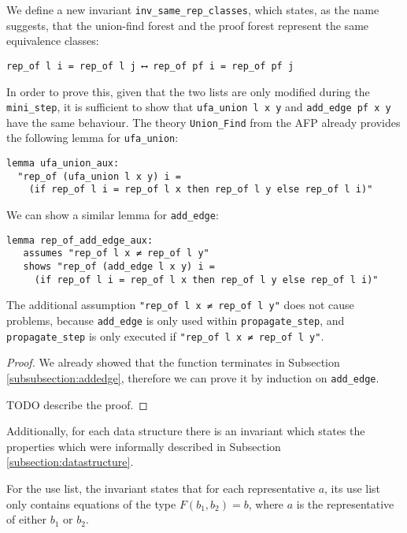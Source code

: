 We define a new invariant \lstinline{inv_same_rep_classes}, which states, as the name suggests, that the union-find forest and the proof forest represent the same equivalence classes:

\begin{lstlisting}
rep_of l i = rep_of l j ⟷ rep_of pf i = rep_of pf j
\end{lstlisting}

In order to prove this, given that the two lists are only modified during the \lstinline{mini_step}, it is sufficient to show that \lstinline{ufa_union l x y} and \lstinline{add_edge pf x y} have the same behaviour. The theory \lstinline{Union_Find} from the AFP\cite{Sep} already provides the following lemma for \lstinline{ufa_union}:

\begin{lstlisting}
lemma ufa_union_aux:
  "rep_of (ufa_union l x y) i =
    (if rep_of l i = rep_of l x then rep_of l y else rep_of l i)"
\end{lstlisting}

We can show a similar lemma for \lstinline{add_edge}:

\begin{lstlisting}
lemma rep_of_add_edge_aux:
   assumes "rep_of l x ≠ rep_of l y"
   shows "rep_of (add_edge l x y) i =
     (if rep_of l i = rep_of l x then rep_of l y else rep_of l i)"
\end{lstlisting}

The additional assumption \lstinline{"rep_of l x ≠ rep_of l y"} does not cause problems, because \lstinline{add_edge} is only used within \lstinline{propagate_step}, and \lstinline{propagate_step} is only executed if \lstinline{"rep_of l x ≠ rep_of l y"}.

\begin{proof}
We already showed that the function terminates in Subsection \ref{subsubsection:addedge}, therefore we can prove it by induction on \lstinline{add_edge}.

TODO describe the proof.
\end{proof}

Additionally, for each data structure there is an invariant which states the properties which were informally described in Subsection \ref{subsection:datastructure}.

For the use list, the invariant states that for each representative $a$, its use list only contains equations of the type $F(b_1, b_2) = b$, where $a$ is the representative of either $b_1$ or $b_2$.

